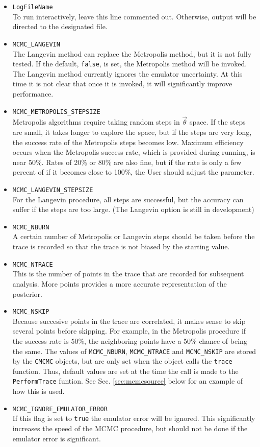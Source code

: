 \documentclass[UserManual.tex]{subfiles}
\begin{document}
\begin{itemize}\itemsep=0pt
\item {\tt LogFileName}\\
To run interactively, leave this line commented out. Otherwise, output will be directed to the designated file.
\item {\tt MCMC\_LANGEVIN}\\
The Langevin method can replace the Metropolis method, but it is not fully tested. If the default, {\tt false}, is set, the Metropolis method will be invoked. The Langevin method currently ignores the emulator uncertainty. At this time it is not clear that once it is invoked, it will significantly improve performance.
\item {\tt MCMC\_METROPOLIS\_STEPSIZE}\\
Metropolis algorithms require taking random steps in $\vec{\theta}$ space. If the steps are small, it takes longer to explore the space, but if the steps are very long, the success rate of the Metropolis steps becomes low. Maximum efficiency occurs when the Metropolis success rate, which is provided during running, is near 50\%. Rates of 20\% or 80\% are also fine, but if the rate is only a few percent of if it becomes close to 100\%, the User should adjust the parameter.
\item{\tt MCMC\_LANGEVIN\_STEPSIZE}\\
For the Langevin procedure, all steps are successful, but the accuracy can suffer if the steps are too large. (The Langevin option is still in development)
\item{\tt MCMC\_NBURN}\\
A certain number of Metropolis or Langevin steps should be taken before the trace is recorded so that the trace is not biased by the starting value.
\item {\tt MCMC\_NTRACE}\\
This is the number of points in the trace that are recorded for subsequent analysis. More points provides a more accurate representation of the posterior.
\item {\tt MCMC\_NSKIP}\\
Because succesive points in the trace are correlated, it makes sense to skip several points before skipping. For example, in the Metropolis procedure if the success rate is 50\%, the neighboring points have a 50\% chance of being the same. The values of {\tt MCMC\_NBURN}, {\tt MCMC\_NTRACE} and {\tt MCMC\_NSKIP} are stored by the {\tt CMCMC} objects, but are only set when the object calls the {\tt trace} function. Thus, default values are set at the time the call is made to the {\tt PerformTrace} funtion.  See Sec. \ref{sec:mcmcsource} below for an example of how this is used. 
\item {\tt MCMC\_IGNORE\_EMULATOR\_ERROR}\\
If this flag is set to {\tt true} the emulator error will be ignored. This significantly increases the speed of the MCMC procedure, but should not be done if the emulator error is significant.
\end{itemize}
\end{document}
